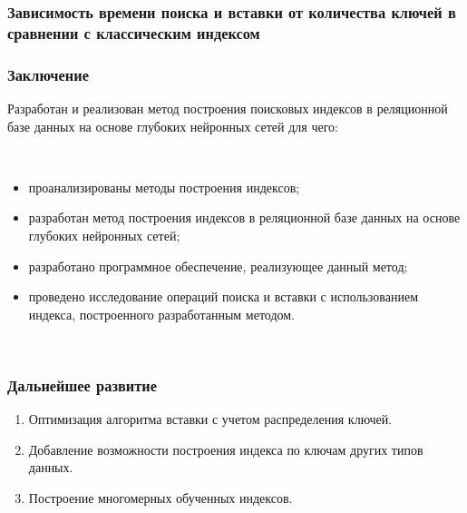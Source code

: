 \documentclass[8pt]{bmstu-pr}
\begin{document}

\begin{frame}
    \frametitle{Зависимость времени поиска и вставки от количества ключей в
    сравнении с классическим индексом}
    \vspace{-0.2cm}
\end{frame}


\begin{frame}
    \fontsize{22pt}{22pt}\selectfont
    \frametitle{Заключение}

    \parbox[t]{\linewidth}{
        Разработан и реализован метод построения поисковых индексов в
        реляционной базе данных на основе глубоких нейронных сетей для чего:
    }

    ~\\
    \parbox[t]{\linewidth}{
        \begin{itemize}
            \item проанализированы методы построения индексов;
            \item разработан метод построения индексов в реляционной базе
                \mbox{данных} на основе глубоких нейронных сетей;
            \item разработано программное обеспечение, реализующее данный
                \mbox{метод};
            \item проведено исследование операций поиска и вставки с
                \mbox{использованием} индекса, построенного разработанным
                методом.
        \end{itemize}
    }
    ~\\
\end{frame}

\begin{frame}
    \fontsize{22pt}{22pt}\selectfont
    \frametitle{Дальнейшее развитие}
    \begin{enumerate}
        \item Оптимизация алгоритма вставки с учетом распределения ключей.
        \item Добавление возможности построения индекса по ключам других типов
            данных.
        \item  Построение многомерных обученных индексов.
    \end{enumerate}
    ~\\
\end{frame}
\end{document}
